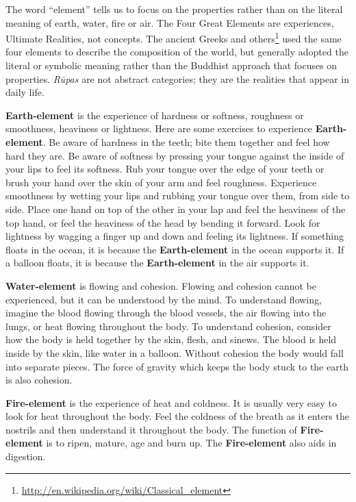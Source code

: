 The word “element” tells us to focus on the properties rather than on the literal meaning of earth, water, fire or air. The Four Great Elements are experiences, Ultimate Realities, not concepts. The ancient Greeks and others\footnote{\url{http://en.wikipedia.org/wiki/Classical_element}} used the same four elements to describe the composition of the world, but generally adopted the literal or symbolic meaning rather than the Buddhist approach that focuses on properties. \textit{Rūpas} are not abstract categories; they are the realities that appear in daily life.

\textbf{Earth-element} is the experience of hardness or softness, roughness or smoothness, heaviness or lightness. Here are some exercises to experience \textbf{Earth-element}. Be aware of hardness in the teeth; bite them together and feel how hard they are. Be aware of softness by pressing your tongue against the inside of your lips to feel its softness. Rub your tongue over the edge of your teeth or brush your hand over the skin of your arm and feel roughness. Experience smoothness by wetting your lips and rubbing your tongue over them, from side to side. Place one hand on top of the other in your lap and feel the heaviness of the top hand, or feel the heaviness of the head by bending it forward. Look for lightness by wagging a finger up and down and feeling its lightness. If something floats in the ocean, it is because the \textbf{Earth-element} in the ocean supports it. If a balloon floats, it is because the \textbf{Earth-element} in the air supports it.

\textbf{Water-element} is flowing and cohesion. Flowing and cohesion cannot be experienced, but it can be understood by the mind. To understand flowing, imagine the blood flowing through the blood vessels, the air flowing into the lungs, or heat flowing throughout the body. To understand cohesion, consider how the body is held together by the skin, flesh, and sinews. The blood is held inside by the skin, like water in a balloon. Without cohesion the body would fall into separate pieces. The force of gravity which keeps the body stuck to the earth is also cohesion.

\textbf{Fire-element} is the experience of heat and coldness. It is usually very easy to look for heat throughout the body. Feel the coldness of the breath as it enters the nostrils and then understand it throughout the body. The function of \textbf{Fire-element} is to ripen, mature, age and burn up. The \textbf{Fire-element} also aids in digestion.

